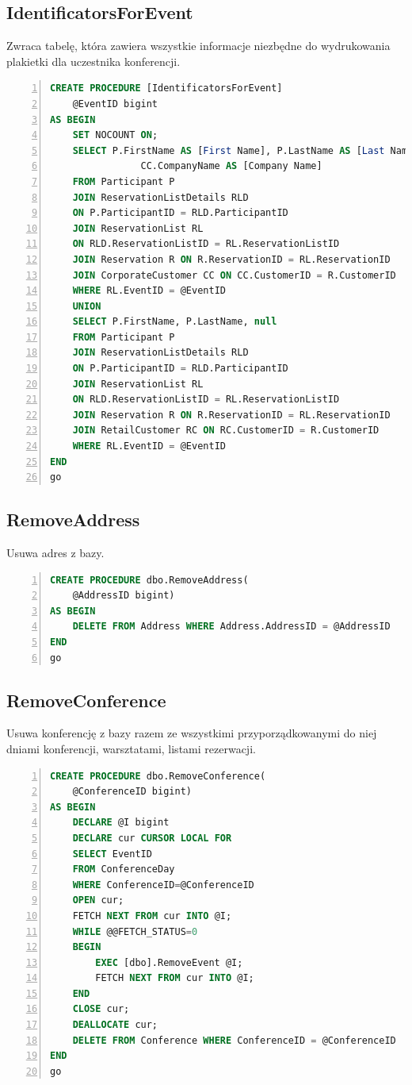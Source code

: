 \documentclass[]{article}
\begin{document}
	\subsection{IdentificatorsForEvent}
	Zwraca tabelę, która zawiera wszystkie informacje niezbędne do wydrukowania plakietki dla uczestnika konferencji.
	\begin{lstlisting}[language=SQL,
						showspaces=false,
						basicstyle=\ttfamily,
						numbers=left,
						numberstyle=\tiny,
						backgroundcolor=\color{lightg},
						keywordstyle=\color{lightblue},
						commentstyle=\color{gray}]
CREATE PROCEDURE [IdentificatorsForEvent]
	@EventID bigint
AS BEGIN
	SET NOCOUNT ON;
	SELECT P.FirstName AS [First Name], P.LastName AS [Last Name],
				CC.CompanyName AS [Company Name]
	FROM Participant P
	JOIN ReservationListDetails RLD
	ON P.ParticipantID = RLD.ParticipantID
	JOIN ReservationList RL
	ON RLD.ReservationListID = RL.ReservationListID
	JOIN Reservation R ON R.ReservationID = RL.ReservationID
	JOIN CorporateCustomer CC ON CC.CustomerID = R.CustomerID
	WHERE RL.EventID = @EventID
	UNION
	SELECT P.FirstName, P.LastName, null
	FROM Participant P
	JOIN ReservationListDetails RLD
	ON P.ParticipantID = RLD.ParticipantID
	JOIN ReservationList RL
	ON RLD.ReservationListID = RL.ReservationListID
	JOIN Reservation R ON R.ReservationID = RL.ReservationID
	JOIN RetailCustomer RC ON RC.CustomerID = R.CustomerID
	WHERE RL.EventID = @EventID
END
go
	\end{lstlisting}
	
	\subsection{RemoveAddress}
	Usuwa adres z bazy.
	\begin{lstlisting}[language=SQL,
						showspaces=false,
						basicstyle=\ttfamily,
						numbers=left,
						numberstyle=\tiny,
						backgroundcolor=\color{lightg},
						keywordstyle=\color{lightblue},
						commentstyle=\color{gray}]
CREATE PROCEDURE dbo.RemoveAddress(
	@AddressID bigint)
AS BEGIN
	DELETE FROM Address WHERE Address.AddressID = @AddressID
END
go
	\end{lstlisting}
	
	\subsection{RemoveConference}
	Usuwa konferencję z bazy razem ze wszystkimi przyporządkowanymi do niej dniami konferencji, warsztatami, listami rezerwacji.
	\begin{lstlisting}[language=SQL,
						showspaces=false,
						basicstyle=\ttfamily,
						numbers=left,
						numberstyle=\tiny,
						backgroundcolor=\color{lightg},
						keywordstyle=\color{lightblue},
						commentstyle=\color{gray}]
CREATE PROCEDURE dbo.RemoveConference(
	@ConferenceID bigint)
AS BEGIN
	DECLARE @I bigint
	DECLARE cur CURSOR LOCAL FOR
	SELECT EventID
	FROM ConferenceDay
	WHERE ConferenceID=@ConferenceID
	OPEN cur;
	FETCH NEXT FROM cur INTO @I;
	WHILE @@FETCH_STATUS=0
	BEGIN
		EXEC [dbo].RemoveEvent @I;
		FETCH NEXT FROM cur INTO @I;
	END
	CLOSE cur;
	DEALLOCATE cur;
	DELETE FROM Conference WHERE ConferenceID = @ConferenceID
END
go
	\end{lstlisting}
	
\end{document}
